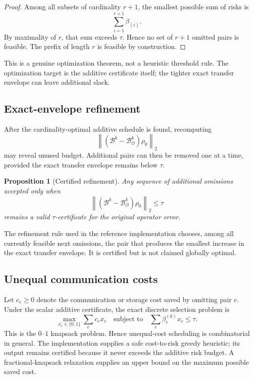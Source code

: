 \documentclass[11pt]{article}
\newtheorem{proposition}[theorem]{Proposition}
\theoremstyle{definition}
\theoremstyle{remark}
\begin{document}
\begin{proof}
Among all subsets of cardinality $r+1$, the smallest possible sum of risks is
\[
\sum_{i=1}^{r+1}\beta_{(i)}.
\]
By maximality of $r$, that sum exceeds $\tau$.  Hence no set of $r+1$ omitted
pairs is feasible.  The prefix of length $r$ is feasible by construction.
\end{proof}

This is a genuine optimization theorem, not a heuristic threshold rule.  The
optimization target is the additive certificate itself; the tighter exact
transfer envelope can leave additional slack.

\subsection{Exact-envelope refinement}

After the cardinality-optimal additive schedule is found, recomputing
\[
\left\lVert
(\mathcal B^k-\mathcal B_{\mathcal O}^k)\rho_0
\right\rVert_2
\]
may reveal unused budget.  Additional pairs can then be removed one at a time,
provided the exact transfer envelope remains below $\tau$.

\begin{proposition}[Certified refinement]
Any sequence of additional omissions accepted only when
\[
\left\lVert
(\mathcal B^k-\mathcal B_{\mathcal O}^k)\rho_0
\right\rVert_2\le\tau
\]
remains a valid $\tau$-certificate for the original operator error.
\end{proposition}

The refinement rule used in the reference implementation chooses, among all
currently feasible next omissions, the pair that produces the smallest
increase in the exact transfer envelope.  It is certified but is not claimed
globally optimal.

\subsection{Unequal communication costs}

Let $c_e\ge0$ denote the communication or storage cost saved by omitting pair
$e$.  Under the scalar additive certificate, the exact discrete selection
problem is
\[
\boxed{
\max_{x_e\in\{0,1\}}
\sum_e c_ex_e
\quad\text{subject to}\quad
\sum_e\beta_e^{(k)}x_e\le\tau.
}
\]
This is the $0$--$1$ knapsack problem.  Hence unequal-cost scheduling is
combinatorial in general.  The implementation supplies a safe
cost-to-risk greedy heuristic; its output remains certified because it never
exceeds the additive risk budget.  A fractional-knapsack relaxation supplies
an upper bound on the maximum possible saved cost.
\end{document}
